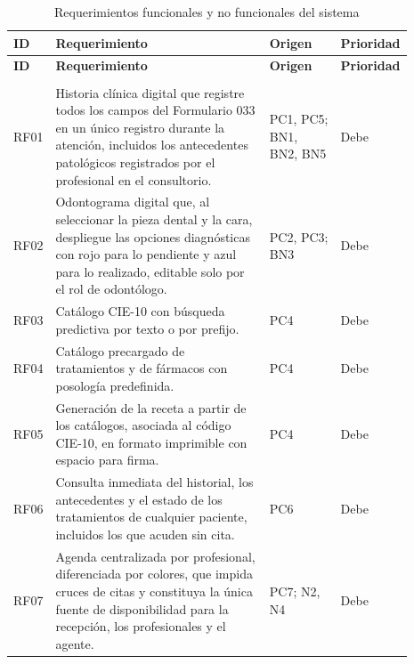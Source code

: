 \begingroup
\fontsize{9}{11}\selectfont
\renewcommand{\arraystretch}{1.2}
\setlength{\LTpre}{0pt}\setlength{\LTpost}{6pt}
\setlength{\tabcolsep}{4pt}
\begin{longtable}{|>{\centering\arraybackslash}p{0.06\linewidth}|p{0.55\linewidth}|p{0.18\linewidth}|>{\centering\arraybackslash}p{0.10\linewidth}|}
\caption{Requerimientos funcionales y no funcionales del sistema}
\label{tab:requerimientos} \\
\hline
\textbf{ID} & \textbf{Requerimiento} & \textbf{Origen} & \textbf{Prioridad} \\ \hline
\endfirsthead
\hline
\textbf{ID} & \textbf{Requerimiento} & \textbf{Origen} & \textbf{Prioridad} \\ \hline
\endhead

\multicolumn{4}{|l|}{\cellcolor{gray!10}\textbf{Requerimientos funcionales: gestión clínico-administrativa}} \\ \hline

RF01 & Historia clínica digital que registre todos los campos del Formulario 033 en un único registro durante la atención, incluidos los antecedentes patológicos registrados por el profesional en el consultorio. & PC1, PC5; BN1, BN2, BN5 & Debe \\ \hline

RF02 & Odontograma digital que, al seleccionar la pieza dental y la cara, despliegue las opciones diagnósticas con rojo para lo pendiente y azul para lo realizado, editable solo por el rol de odontólogo. & PC2, PC3; BN3 & Debe \\ \hline

RF03 & Catálogo CIE-10 con búsqueda predictiva por texto o por prefijo. & PC4 & Debe \\ \hline

RF04 & Catálogo precargado de tratamientos y de fármacos con posología predefinida. & PC4 & Debe \\ \hline

RF05 & Generación de la receta a partir de los catálogos, asociada al código CIE-10, en formato imprimible con espacio para firma. & PC4 & Debe \\ \hline

RF06 & Consulta inmediata del historial, los antecedentes y el estado de los tratamientos de cualquier paciente, incluidos los que acuden sin cita. & PC6 & Debe \\ \hline

RF07 & Agenda centralizada por profesional, diferenciada por colores, que impida cruces de citas y constituya la única fuente de disponibilidad para la recepción, los profesionales y el agente. & PC7; N2, N4 & Debe \\ \hline


\end{longtable}
